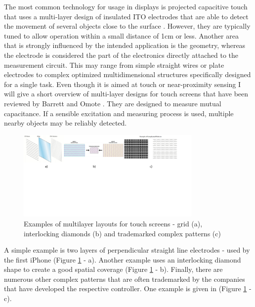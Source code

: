 The most common technology for usage in displays is projected capacitive touch that uses a multi-layer design of insulated ITO electrodes that are able to detect the movement of several objects close to the surface \cite{Barrett2010}. However, they are typically tuned to allow operation within a small distance of 1cm or less. 
Another area that is strongly influenced by the intended application is the geometry, whereas the electrode is considered the part of the electronics directly attached to the measurement circuit. This may range from simple straight wires or plate electrodes to complex optimized multidimensional structures specifically designed for a single task. Even though it is aimed at touch or near-proximity sensing I will give a short overview of  multi-layer designs for touch screens that have been reviewed by Barrett and Omote \cite{BarrettScreen}. They are designed to measure mutual capacitance. If a sensible excitation and measuring process is used, multiple nearby objects may be reliably detected. 

\begin{figure} [h]
\centering
\includegraphics[width=0.8\textwidth]{images/ito_multilayer} 
\caption{Examples of multilayer layouts for touch screens - grid (a), interlocking diamonds (b) and  trademarked complex patterns (c) \cite{BarrettScreen}}
\label{fig:ito_multilayer}
\end{figure}

A simple example is two layers of perpendicular straight line electrodes - used by the first iPhone (Figure \ref{fig:ito_multilayer} - a). Another example uses an interlocking diamond shape \cite{Dietz2001a} to create a good spatial coverage (Figure \ref{fig:ito_multilayer} - b). Finally, there are numerous other complex patterns that are often trademarked by the companies that have developed the respective controller. One example is given in (Figure \ref{fig:ito_multilayer} - c). 

